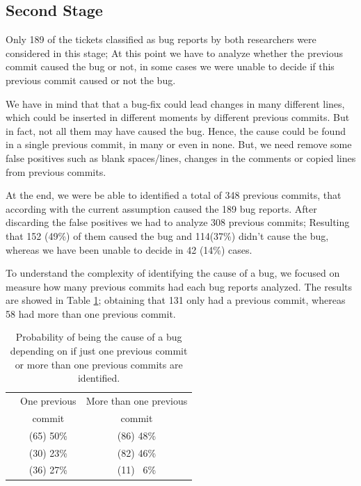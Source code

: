 \documentclass[ifip]{svmult}
\begin{document}
\subsection{Second Stage}
\label{sec:resultsSS}

Only 189 of the tickets classified as bug reports by both researchers were considered in this stage; At this point we have to analyze whether the previous commit caused the bug or not, in some cases we were unable to decide if this previous commit caused or not the bug.

We have in mind that that a bug-fix could lead changes in many different lines, which could be inserted in different moments by different previous commits. But in fact, not all them may have caused the bug. Hence, the cause could be found in a single previous commit, in many or even in none. But, we need remove some false positives such as blank spaces/lines, changes in the comments or  copied lines from previous commits.  

At the end, we were be able to identified a total of 348 previous commits, that according with the current assumption caused the 189 bug reports. After discarding the false positives we had to analyze 308 previous commits; Resulting that 152 (49\%) of them caused the bug and 114(37\%) didn't cause the bug, whereas we have been unable to decide in 42 (14\%) cases.

To understand the complexity of identifying the cause of a bug, we focused on measure how many previous commits had each bug reports analyzed. The results are showed in Table \ref{tab:secondStage}; obtaining that 131 only had a previous commit, whereas 58 had more than one previous commit. 

\begin{table}[htb]
\begin{center} {\footnotesize
\begin{tabular}{lcc}
\toprule[0.3mm]
  & \multicolumn{1}{c}{One previous } & \multicolumn{1}{c}{More than one previous} \\
  & \multicolumn{1}{c}{commit} & \multicolumn{1}{c}{commit} \\\hline
\raisebox{1ex}{Cause}     & (65) 50\% & (86) 48\% \\[0ex]
\raisebox{1ex}{Not cause} & (30) 23\% & (82) 46\% \\[0ex]
\raisebox{1ex}{Undecided} & (36) 27\% & (11) ~6\% \\[0ex]
\bottomrule[0.3mm]
\end{tabular} }
\caption{Probability of being the cause of a bug depending on if just one previous commit or more than one previous commits are identified.}
\label{tab:secondStage}
\end{center}
\end{table}
\end{document}
